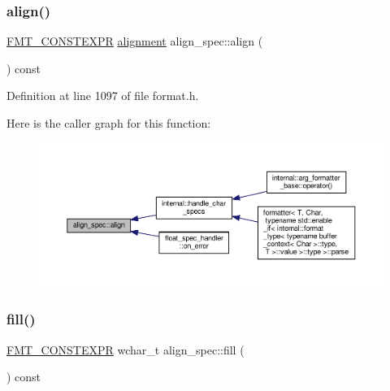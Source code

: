 \subsubsection{\texorpdfstring{align()}{align()}}
{\footnotesize\ttfamily \hyperlink{core_8h_a69201cb276383873487bf68b4ef8b4cd}{F\+M\+T\+\_\+\+C\+O\+N\+S\+T\+E\+X\+PR} \hyperlink{format_8h_a5460ac1c70db05be4ec2268f463ea981}{alignment} align\+\_\+spec\+::align (\begin{DoxyParamCaption}{ }\end{DoxyParamCaption}) const\hspace{0.3cm}{\ttfamily [inline]}}



Definition at line 1097 of file format.\+h.

Here is the caller graph for this function\+:
\nopagebreak
\begin{figure}[H]
\begin{center}
\leavevmode
\includegraphics[width=350pt]{structalign__spec_a538c770bce8dfea8510e1ff82e62e2ac_icgraph}
\end{center}
\end{figure}
\mbox{\label{structalign__spec_aa32e6aa1f46445d0d0d4f7dadbba9e21}} 
\subsubsection{\texorpdfstring{fill()}{fill()}}
{\footnotesize\ttfamily \hyperlink{core_8h_a69201cb276383873487bf68b4ef8b4cd}{F\+M\+T\+\_\+\+C\+O\+N\+S\+T\+E\+X\+PR} wchar\+\_\+t align\+\_\+spec\+::fill (\begin{DoxyParamCaption}{ }\end{DoxyParamCaption}) const\hspace{0.3cm}{\ttfamily [inline]}}



